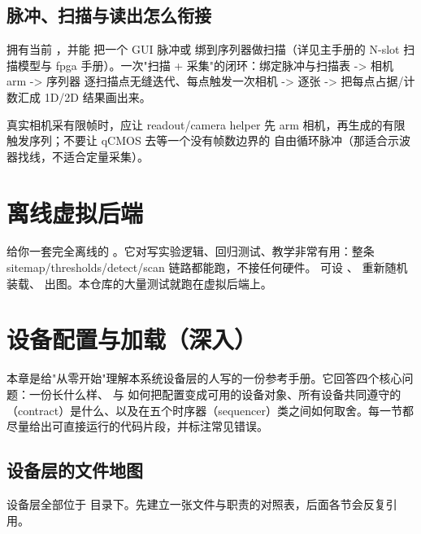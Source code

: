 \documentclass[11pt,oneside,openany]{book}
\begin{document}
\section{脉冲、扫描与读出怎么衔接}
 拥有当前 ，并能  把一个 GUI 脉冲或  绑到序列器做扫描（详见主手册的 N-slot 扫描模型与 fpga 手册）。一次"扫描 + 采集"的闭环：绑定脉冲与扫描表 -> 相机 arm -> 序列器  逐扫描点无缝迭代、每点触发一次相机 -> 逐张  -> 把每点占据/计数汇成 1D/2D 结果画出来。

\begin{notebox}
真实相机采有限帧时，应让 readout/camera helper 先 arm 相机，再生成的有限触发序列；不要让 qCMOS 去等一个没有帧数边界的  自由循环脉冲（那适合示波器找线，不适合定量采集）。
\end{notebox}

\chapter{离线虚拟后端}
 给你一套完全离线的 。它对写实验逻辑、回归测试、教学非常有用：整条 sitemap/thresholds/detect/scan 链路都能跑，不接任何硬件。 可设 、 重新随机装载、 出图。本仓库的大量测试就跑在虚拟后端上。

\chapter{设备配置与加载（深入）}

本章是给"从零开始"理解本系统设备层的人写的一份参考手册。它回答四个核心问题：一份长什么样、 与  如何把配置变成可用的设备对象、所有设备共同遵守的（contract）是什么、以及在五个时序器（sequencer）类之间如何取舍。每一节都尽量给出可直接运行的代码片段，并标注常见错误。

\section{设备层的文件地图}

设备层全部位于  目录下。先建立一张文件与职责的对照表，后面各节会反复引用。
\end{document}
